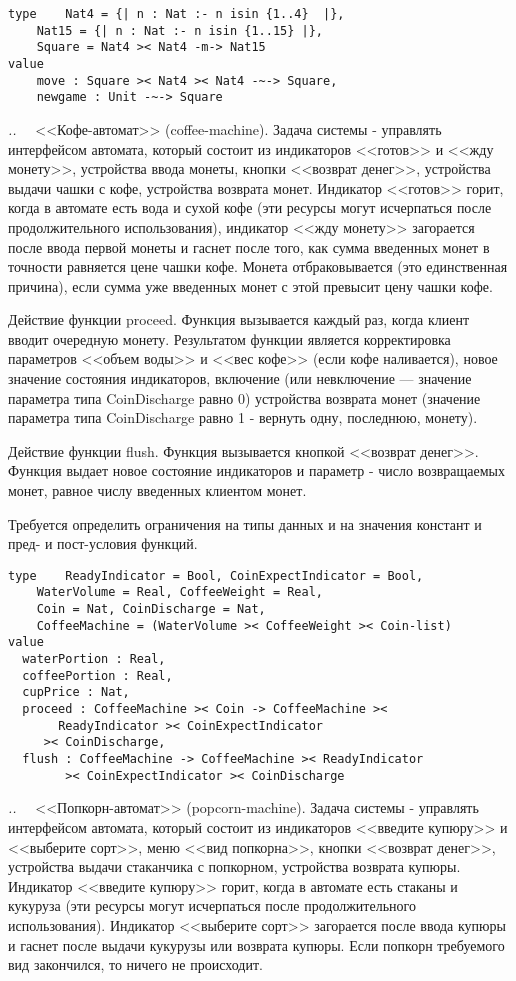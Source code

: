 \documentclass[14pt, twoside]{extreport}
\newcounter{problem_type}[chapter]
\newcounter{zadacha}[problem_type]
\newcommand{\z}{\vspace{0.5cm}\par\addtocounter{zadacha}{1}%
\textit{\arabic{chapter}.\arabic{problem_type}.\arabic{zadacha}}~~  }
\begin{document}
\begin{lstlisting}
type 	Nat4 = {| n : Nat :- n isin {1..4}  |},
	Nat15 = {| n : Nat :- n isin {1..15} |},
	Square = Nat4 >< Nat4 -m-> Nat15
value
	move : Square >< Nat4 >< Nat4 -~-> Square,
	newgame : Unit -~-> Square
\end{lstlisting}

\z <<Кофе-автомат>> (coffee-machine). Задача системы - управлять интерфейсом автомата, который состоит из индикаторов <<готов>> и <<жду монету>>, устройства ввода монеты, кнопки <<возврат денег>>, устройства выдачи чашки с кофе, устройства возврата монет. Индикатор <<готов>> горит, когда в автомате есть вода и сухой кофе (эти ресурсы могут исчерпаться после продолжительного использования), индикатор <<жду монету>> загорается после ввода первой монеты и гаснет после того, как сумма введенных монет в точности равняется цене чашки кофе. Монета отбраковывается (это единственная причина), если сумма уже введенных монет с этой превысит цену чашки кофе.

Действие функции proceed. Функция вызывается каждый раз, когда клиент вводит очередную монету. Результатом функции является корректировка параметров <<объем воды>> и <<вес кофе>> (если кофе наливается), новое значение состояния индикаторов, включение (или невключение --- значение параметра типа CoinDischarge равно 0) устройства возврата монет (значение параметра типа CoinDischarge равно 1 - вернуть одну, последнюю, монету).

Действие функции flush. Функция вызывается кнопкой <<возврат денег>>. Функция выдает новое состояние индикаторов и параметр - число возвращаемых монет, равное числу введенных клиентом монет.

Требуется определить ограничения на типы данных и на значения констант и пред- и пост-условия функций.

\begin{lstlisting}
type	ReadyIndicator = Bool, CoinExpectIndicator = Bool,
	WaterVolume = Real, CoffeeWeight = Real,
    Coin = Nat, CoinDischarge = Nat,
	CoffeeMachine = (WaterVolume >< CoffeeWeight >< Coin-list)
value
  waterPortion : Real,
  coffeePortion : Real,
  cupPrice : Nat,
  proceed : CoffeeMachine >< Coin -> CoffeeMachine ><
	   ReadyIndicator >< CoinExpectIndicator
     >< CoinDischarge,
  flush : CoffeeMachine -> CoffeeMachine >< ReadyIndicator
        >< CoinExpectIndicator >< CoinDischarge
\end{lstlisting}

\z <<Попкорн-автомат>> (popcorn-machine). Задача системы - управлять интерфейсом автомата, который состоит из индикаторов <<введите купюру>> и <<выберите сорт>>, меню <<вид попкорна>>, кнопки <<возврат денег>>, устройства выдачи стаканчика с попкорном, устройства возврата купюры. Индикатор <<введите купюру>>  горит, когда в автомате есть стаканы и кукуруза (эти ресурсы могут исчерпаться после продолжительного использования). Индикатор <<выберите сорт>> загорается после ввода купюры и гаснет после выдачи кукурузы или возврата купюры. Если попкорн требуемого вид закончился, то ничего не происходит.
\end{document}
